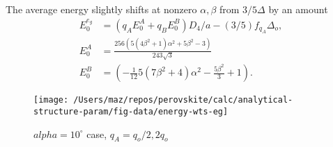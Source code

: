 \documentclass[a4paper,prb]{revtex4-1}  %
\newcommand{\com}[1]{}
\begin{document}
The average energy slightly shifts at nonzero $\alpha,\beta$
from $3/5\Delta$ by an amount
\begin{align}
E_0^{e_{g}} &= \left(q_A E_0^A +q_B E_0^B\right)D_4/a - (3/5)f_{q_A}\Delta_o,\\
E_0^A &=
\frac{256 \left(5 \left(4 \beta ^2+1\right) \alpha ^2+5 \beta ^2-3\right)}{243 \sqrt{3}}\\
E_0^B &=
(-\frac{1}{12} 5 \left(7 \beta ^2+4\right) \alpha ^2-\frac{5 \beta ^2}{3}+1).
\end{align}


\com{
\begin{align}
H_{x^2-y^2,z^2}&=
\left[\frac{}{} \Lambda_{2}  D_2 + \Lambda_4 D_4\right],\\
\Lambda_{l} =&  \left(q_A \Lambda_{l}^A + q_B\Lambda_{l}^B\right)/a,~(l=2,4),\\
\Lambda_{2}^A =&
\frac{256 \alpha ^2 \beta }{189},\\
\Lambda_{4}^A =&
-\frac{1}{567} \left(5120 \alpha ^2 \beta \right),\\
\Lambda_{2}^B =&\frac{1}{7} (-4) \sqrt{3} \alpha ^2 \beta ,\\
\Lambda_{4}^B =&\frac{10}{7} \sqrt{3} \alpha ^2 \beta
\end{align}
}



\begin{figure}[htbp]
\begin{center}
\texttt{[image: /Users/maz/repos/perovskite/calc/analytical-structure-param/fig-data/energy-wts-eg]}
\caption{$alpha=10^\circ$ case, $q_A=q_o/2,2q_o$}
\label{fig:e-wts-eg}
\end{center}
\end{figure}
\end{document}

